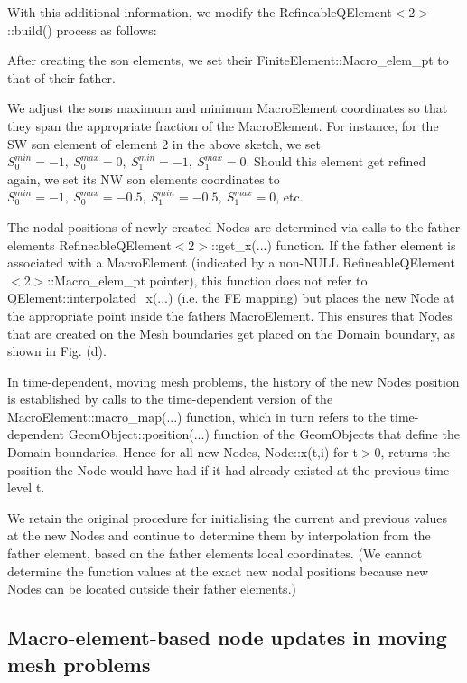 With this additional information, we modify the {\ttfamily Refineable\+Q\+Element$<$2$>$\+::build()} process as follows\+:
\begin{DoxyItemize}
\item After creating the son elements, we set their {\ttfamily Finite\+Element\+::\+Macro\+\_\+elem\+\_\+pt} to that of their father.
\item We adjust the son\textquotesingle{}s maximum and minimum {\ttfamily Macro\+Element} coordinates so that they span the appropriate fraction of the {\ttfamily Macro\+Element}. For instance, for the SW son element of element 2 in the above sketch, we set $ S_0^{min}=-1, \ S_0^{max}=0, \ S_1^{min}=-1, \ S_1^{max}=0 $. Should this element get refined again, we set its NW son element\textquotesingle{}s coordinates to $ S_0^{min}=-1, \ S_0^{max}=-0.5, \ S_1^{min}=-0.5, \ S_1^{max}=0 $, etc.
\item The nodal positions of newly created {\ttfamily Nodes} are determined via calls to the father element\textquotesingle{}s {\ttfamily Refineable\+Q\+Element$<$2$>$\+::get\+\_\+x}(...) function. If the father element is associated with a {\ttfamily Macro\+Element} (indicated by a non-\/\+N\+U\+LL {\ttfamily Refineable\+Q\+Element$<$2$>$\+::\+Macro\+\_\+elem\+\_\+pt} pointer), this function does not refer to {\ttfamily Q\+Element\+::interpolated\+\_\+x}(...) (i.\+e. the FE mapping) but places the new {\ttfamily Node} at the appropriate point inside the father\textquotesingle{}s {\ttfamily Macro\+Element}. This ensures that {\ttfamily Nodes} that are created on the {\ttfamily Mesh} boundaries get placed on the {\ttfamily Domain} boundary, as shown in Fig. (d).
\item In time-\/dependent, moving mesh problems, the history of the new {\ttfamily Nodes\textquotesingle{}} position is established by calls to the time-\/dependent version of the {\ttfamily Macro\+Element\+::macro\+\_\+map}(...) function, which in turn refers to the time-\/dependent {\ttfamily Geom\+Object\+::position}(...) function of the {\ttfamily Geom\+Objects} that define the {\ttfamily Domain} boundaries. Hence for all new {\ttfamily Nodes}, {\ttfamily Node\+::x(t,i)} for {\ttfamily t$>$0}, returns the position the {\ttfamily Node} would have had if it had already existed at the previous time level t.
\item We retain the original procedure for initialising the current and previous values at the new {\ttfamily Nodes} and continue to determine them by interpolation from the father element, based on the father element\textquotesingle{}s local coordinates. (We cannot determine the function values at the exact new nodal positions because new {\ttfamily Nodes} can be located outside their father elements.)
\end{DoxyItemize}\hypertarget{index_moving_mesh}{}\subsection{Macro-\/element-\/based node updates in moving mesh problems}\label{index_moving_mesh}
